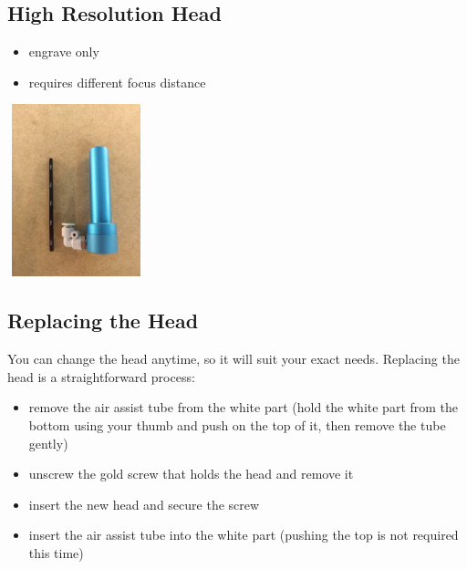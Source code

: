 \documentclass[fleqn]{article}
\begin{document}
\begin{multicols}{3}
\begin{center}
	\subsection{High Resolution Head}
\end{center}
\begin{itemize}[topsep=8pt]
	\item engrave only
	\item requires different focus distance
\end{itemize}
\bigskip\bigskip
\begin{center}
	\includegraphics[width=4cm, height=5cm]{imgs/head_hr.jpeg}
\end{center}
\vfill\null
\columnbreak
\end{multicols}
	
\subsection{Replacing the Head}
You can change the head anytime, so it will suit your exact needs. Replacing the head is a straightforward process:

	\begin{itemize}[noitemsep,topsep=0pt]
		
		\item remove the air assist tube from the white part (hold the white part from the bottom using your thumb and push on the top of it, then remove the tube gently)
		\item unscrew the gold screw that holds the head and remove it
		\item insert the new head and secure the screw
		\item insert the air assist tube into the white part (pushing the top is not required this time)
		
	\end{itemize}
	
	
\end{document}
